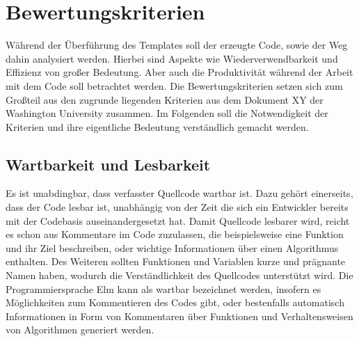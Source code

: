 \section{Bewertungskriterien}
\label{sec:Bewertungskriterien}
Während der Überführung des Templates soll der erzeugte Code, sowie der Weg dahin analysiert werden. Hierbei sind Aspekte wie Wiederverwendbarkeit und Effizienz von großer Bedeutung. Aber auch die Produktivität während der Arbeit mit dem Code soll betrachtet werden. Die Bewertungskriterien setzen sich zum Großteil aus den zugrunde liegenden Kriterien aus dem Dokument XY der Washington University zusammen. Im Folgenden soll die Notwendigkeit der Kriterien und ihre eigentliche Bedeutung verständlich gemacht werden.




\subsection{Wartbarkeit und Lesbarkeit}
\label{sec:muster_wartbarkeit_und_lesbarkeit}
Es ist unabdingbar, dass verfasster Quellcode wartbar ist. Dazu gehört einerseits, dass der Code lesbar ist, unabhängig von der Zeit die sich ein Entwickler bereits mit der Codebasis auseinandergesetzt hat. Damit Quellcode lesbarer wird, reicht es schon aus Kommentare im Code zuzulassen, die beispielsweise eine Funktion und ihr Ziel beschreiben, oder wichtige Informationen über einen Algorithmus enthalten. Des Weiteren sollten Funktionen und Variablen kurze und prägnante Namen haben, wodurch die Verständlichkeit des Quellcodes unterstützt wird. Die Programmiersprache Elm kann als wartbar bezeichnet werden, insofern es Möglichkeiten zum Kommentieren des Codes gibt, oder bestenfalls automatisch Informationen in Form von Kommentaren über Funktionen und Verhaltensweisen von Algorithmen generiert werden.


